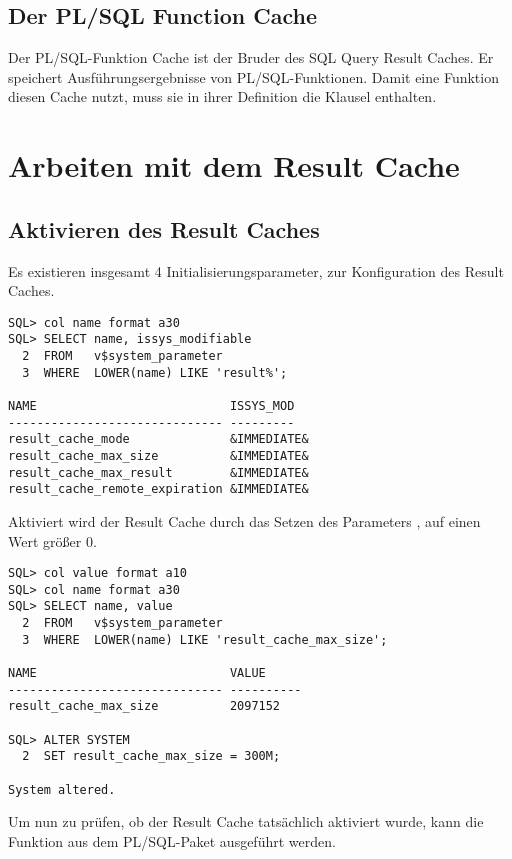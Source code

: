       \subsection{Der PL/SQL Function Cache}
        Der PL/SQL-Funktion Cache ist der Bruder des SQL Query Result Caches. Er speichert Ausf\"uhrungsergebnisse von PL/SQL-Funktionen. Damit eine Funktion diesen Cache nutzt, muss sie in ihrer Definition die Klausel  enthalten.
    \section{Arbeiten mit dem Result Cache}
      \subsection{Aktivieren des Result Caches}
        Es existieren insgesamt 4 Initialisierungsparameter, zur
        Konfiguration des Result Caches.
        \begin{lstlisting}[caption={Die Result Cache Parameter},label=admin700,language=oracle_sql,alsolanguage=sqlplus]
SQL> col name format a30 
SQL> SELECT name, issys_modifiable
  2  FROM   v$system_parameter
  3  WHERE  LOWER(name) LIKE 'result%';

NAME                           ISSYS_MOD
------------------------------ ---------
result_cache_mode              &IMMEDIATE&
result_cache_max_size          &IMMEDIATE&
result_cache_max_result        &IMMEDIATE&
result_cache_remote_expiration &IMMEDIATE&
        \end{lstlisting}
        Aktiviert wird der Result Cache durch das Setzen des Parameters , auf einen Wert gr\"o\ss{}er 0.
        \begin{lstlisting}[caption={Den Result Cache aktivieren},label=admin701,language=oracle_sql,alsolanguage=sqlplus]
SQL> col value format a10
SQL> col name format a30
SQL> SELECT name, value
  2  FROM   v$system_parameter
  3  WHERE  LOWER(name) LIKE 'result_cache_max_size';

NAME                           VALUE
------------------------------ ----------
result_cache_max_size          2097152

SQL> ALTER SYSTEM
  2  SET result_cache_max_size = 300M;

System altered.
        \end{lstlisting}
        Um nun zu pr\"ufen, ob der Result Cache tats\"achlich aktiviert wurde, kann die Funktion  aus dem PL/SQL-Paket  ausgef\"uhrt werden.

